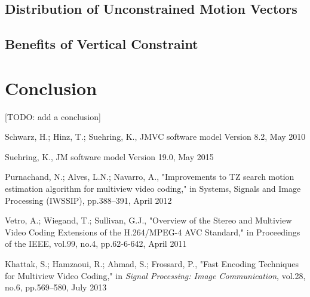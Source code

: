 \documentclass[twoside, 11pt]{article}
\begin{document}
\subsection{Distribution of Unconstrained Motion Vectors}
\label{subsec:unconstrained}

\subsection{Benefits of Vertical Constraint}
\label{subsec:constrained}

\section{Conclusion} %
\label{sec:conclusion} %
[TODO: add a conclusion]

\begin{thebibliography}{10} %
Schwarz, H.; Hinz, T.; Suehring, K.,
JMVC software model Version 8.2, May 2010

Suehring, K., JM software model Version 19.0, May 2015

Purnachand, N.; Alves, L.N.; Navarro, A.,
"Improvements to TZ search motion estimation algorithm for multiview video
coding," in Systems, Signals and Image Processing (IWSSIP),
pp.388--391, April 2012

Vetro, A.; Wiegand, T.; Sullivan, G.J.,
"Overview of the Stereo and Multiview Video Coding Extensions of the
H.264/MPEG-4 AVC Standard," in Proceedings of the IEEE,
vol.99, no.4, pp.62-6-642, April 2011

Khattak, S.; Hamzaoui, R.; Ahmad, S.; Frossard, P.,
"Fast Encoding Techniques for Multiview Video Coding,"
in {\it Signal Processing: Image Communication},
vol.28, no.6, pp.569--580, July 2013

\end{thebibliography}
\end{document}
